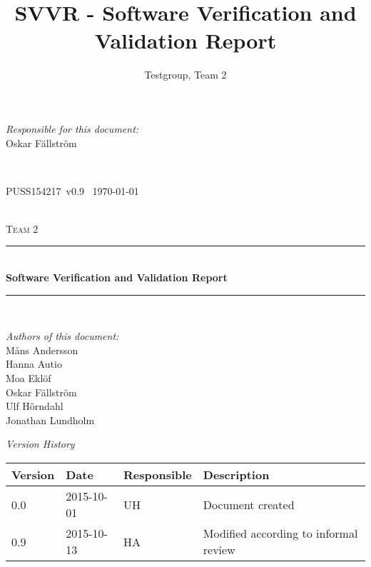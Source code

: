 \documentclass[a4paper]{article}
\title{SVVR - Software Verification and Validation Report}
\author{Testgroup, Team 2}
\newcommand{\version}{v0.9}
\newcommand{\SVVR}{PUSS154217}
\begin{document}
\begin{titlepage}
\newcommand{\HRule}{\rule{\linewidth}{0.5mm}}

\begin{minipage}{0.5\textwidth}
\begin{flushleft} %
\textit{Responsible for this document:}\\
Oskar Fällström %
\end{flushleft}
\end{minipage}
~
\begin{minipage}{0.4\textwidth}
\begin{flushright}
\SVVR\ \version\ %
\today
\end{flushright}
\end{minipage}\\[3cm]

\centering
\textsc{\LARGE Team 2}\\[0.5cm]

\HRule \\[0.4cm]
{ \huge \bfseries Software Verification and Validation Report}\\[0.4cm] %
\HRule \\[1.5cm]

\vfill
\begin{flushleft}
\textit{Authors of this document:}\\
Måns Andersson \\
Hanna Autio \\
Moa Eklöf \\
Oskar Fällström \\
Ulf Hörndahl \\
Jonathan Lundholm
\end{flushleft}	


\end{titlepage}

\begin{center}
\textit{\large Version History}

    \begin{tabular}{ | l | l | l | p{5cm} |}
    \hline
    \textbf{Version}		& \textbf{Date}		& \textbf{Responsible}					& \textbf{Description}					\\ \hline
    0.0						& 2015-10-01 			& UH									& Document created						\\ \hline
    0.9						& 2015-10-13			& HA									& Modified according to informal review\\ \hline
    \end{tabular}
\end{center}
\end{document}
